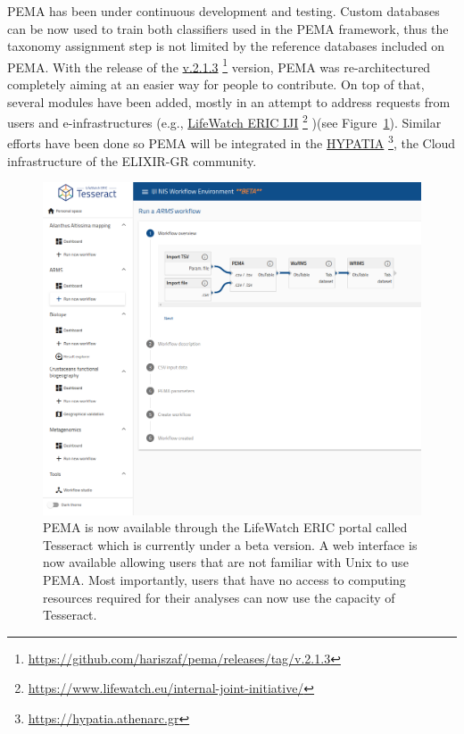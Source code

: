       PEMA has been under continuous development and testing.
      Custom databases can be now used to train both classifiers used in the PEMA framework, thus
      the taxonomy assignment step is not limited by the reference databases included on PEMA.
      With the release of the \href{https://github.com/hariszaf/pema/releases/tag/v.2.1.3}{v.2.1.3}
      \footnote{\href{https://github.com/hariszaf/pema/releases/tag/v.2.1.3}{https://github.com/hariszaf/pema/releases/tag/v.2.1.3}}
      version, PEMA was re-architectured completely aiming at an easier way for people to contribute. 
      On top of that, several modules have been added, mostly in an attempt to address requests from users and
      e-infrastructures (e.g., \href{https://www.lifewatch.eu/internal-joint-initiative/}{LifeWatch ERIC IJI}
      \footnote{\href{https://www.lifewatch.eu/internal-joint-initiative/}{https://www.lifewatch.eu/internal-joint-initiative/}}
      )(see Figure~\ref{fig:pema-lw}). 
      Similar efforts have been done so PEMA will be integrated in the 
      \href{https://hypatia.athenarc.gr/}{HYPATIA}
      \footnote{\href{https://hypatia.athenarc.gr/}{https://hypatia.athenarc.gr}}, 
      the Cloud infrastructure of the ELIXIR-GR community.


      \begin{figure}[h]
         \centering
         \includegraphics[width=0.95\columnwidth]{figures/pema_lw.png}
         \caption[PEMA at LifeWatch ERIC Tesseract portal]{
            PEMA is now available through the LifeWatch ERIC portal called Tesseract which is currently under a beta version. 
            A web interface is now available allowing users that are not familiar with Unix to use PEMA.
            Most importantly, users that have no access to computing resources required for their analyses
            can now use the capacity of Tesseract.  
         }
         \label{fig:pema-lw}
      \end{figure}

